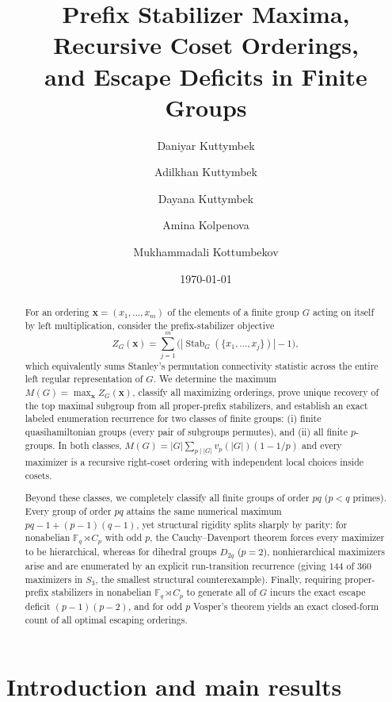 \documentclass[11pt,reqno]{amsart}
\title[Prefix Stabilizer Maxima in Finite Groups]{Prefix Stabilizer Maxima, Recursive Coset Orderings,\\and Escape Deficits in Finite Groups}
\author[D. Kuttymbek]{Daniyar Kuttymbek}
\author[A. Kuttymbek]{Adilkhan Kuttymbek}
\author[D. Kuttymbek]{Dayana Kuttymbek}
\author[A. Kolpenova]{Amina Kolpenova}
\author[M. Kottumbekov]{Mukhammadali Kottumbekov}
\date{\today}
\numberwithin{equation}{section}
\theoremstyle{definition}
\theoremstyle{remark}
\newcommand{\Stab}{\operatorname{Stab}}
\newcommand{\F}{\mathbb{F}}
\begin{document}
\begin{abstract}
For an ordering $\mathbf{x}=(x_1,\ldots,x_m)$ of the elements of a finite group $G$ acting on itself by left multiplication, consider the prefix-stabilizer objective
\[
Z_G(\mathbf{x}) = \sum_{j=1}^{m}\bigl(|\Stab_G(\{x_1,\ldots,x_j\})|-1\bigr),
\]
which equivalently sums Stanley's permutation connectivity statistic across the entire left regular representation of $G$. We determine the maximum $M(G) = \max_{\mathbf{x}} Z_G(\mathbf{x})$, classify all maximizing orderings, prove unique recovery of the top maximal subgroup from all proper-prefix stabilizers, and establish an exact labeled enumeration recurrence for two classes of finite groups: (i) finite quasihamiltonian groups (every pair of subgroups permutes), and (ii) all finite $p$-groups. In both classes, $M(G)=|G|\sum_{p\mid |G|} v_p(|G|)(1-1/p)$ and every maximizer is a recursive right-coset ordering with independent local choices inside cosets.

Beyond these classes, we completely classify all finite groups of order $pq$ ($p<q$ primes). Every group of order $pq$ attains the same numerical maximum $pq-1+(p-1)(q-1)$, yet structural rigidity splits sharply by parity: for nonabelian $\F_q \rtimes C_p$ with odd $p$, the Cauchy--Davenport theorem forces every maximizer to be hierarchical, whereas for dihedral groups $D_{2q}$ ($p=2$), nonhierarchical maximizers arise and are enumerated by an explicit run-transition recurrence (giving $144$ of $360$ maximizers in $S_3$, the smallest structural counterexample). Finally, requiring proper-prefix stabilizers in nonabelian $\F_q \rtimes C_p$ to generate all of $G$ incurs the exact escape deficit $(p-1)(p-2)$, and for odd $p$ Vosper's theorem yields an exact closed-form count of all optimal escaping orderings.
\end{abstract}

\maketitle

\section{Introduction and main results}
\label{sec:intro}
\end{document}
